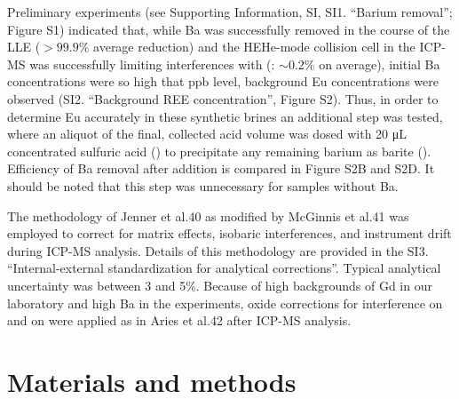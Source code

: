 Preliminary experiments (see Supporting Information, SI, SI1. ``Barium removal''; Figure S1) indicated that, while Ba was successfully removed in the course of the LLE ($>99.9\%$ average reduction) and the HEHe-mode collision cell in the ICP-MS was successfully limiting  interferences with  (: $\sim0.2\%$ on average), initial Ba concentrations were so high that ppb level, background Eu concentrations were observed (SI2. ``Background REE concentration'', Figure S2).
Thus, in order to determine Eu accurately in these synthetic brines an additional step was tested, where an aliquot of the final, collected acid volume was dosed with 20 \si{\uL} concentrated sulfuric acid () to precipitate any remaining barium as barite ().
Efficiency of Ba removal after  addition is compared in Figure S2B and S2D.
It should be noted that this step was unnecessary for samples without Ba.

The methodology of Jenner et al.40 as modified by McGinnis et al.41 was employed to correct for matrix effects, isobaric interferences, and instrument drift during ICP-MS analysis.
Details of this methodology are provided in the SI3. ``Internal-external standardization for analytical corrections''.
Typical analytical uncertainty was between 3 and 5\%.
Because of high backgrounds of Gd in our laboratory and high Ba in the experiments, oxide corrections for  interference on  and  on  were applied as in Aries et al.42 after ICP-MS analysis.

\section{Materials and methods}\label{sec:MnM}

%
%
